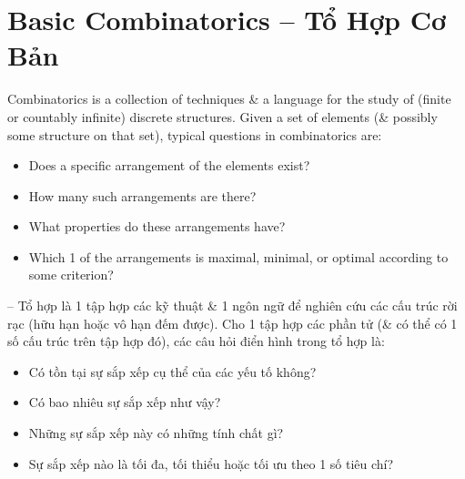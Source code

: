 \documentclass[oneside]{book}
\begin{document}
\section{Basic Combinatorics -- Tổ Hợp Cơ Bản}
Combinatorics is a collection of techniques \& a language for the study of (finite or countably infinite) discrete structures. Given a set of elements (\& possibly some structure on that set), typical questions in combinatorics are:
\begin{itemize}
	\item Does a specific arrangement of the elements exist?
	\item How many such arrangements are there?
	\item What properties do these arrangements have?
	\item Which 1 of the arrangements is maximal, minimal, or optimal according to some criterion?
\end{itemize}
-- Tổ hợp là 1 tập hợp các kỹ thuật \& 1 ngôn ngữ để nghiên cứu các cấu trúc rời rạc (hữu hạn hoặc vô hạn đếm được). Cho 1 tập hợp các phần tử (\& có thể có 1 số cấu trúc trên tập hợp đó), các câu hỏi điển hình trong tổ hợp là:
\begin{itemize}
	\item Có tồn tại sự sắp xếp cụ thể của các yếu tố không?
	\item Có bao nhiêu sự sắp xếp như vậy?
	\item Những sự sắp xếp này có những tính chất gì?
	\item Sự sắp xếp nào là tối đa, tối thiểu hoặc tối ưu theo 1 số tiêu chí?
\end{itemize}

\end{document}
